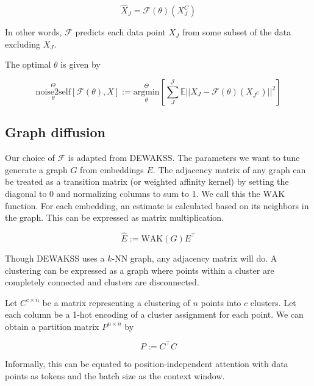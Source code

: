 \documentclass{article}
\begin{document}
\begin{equation}
  \hat{X}_J=\mathcal{F}(\theta)(X_J^C)
\end{equation}

In other words, $\mathcal{F}$ predicts each data point $X_J$ from some subset of the data excluding $X_J$. 

  The optimal $\theta$ is given by

\begin{equation}
  \underset{\theta}{\overset{\Theta}{\mathrm{noise2self}}}[\mathcal{F}(\theta),X] := \underset{\theta}{\overset{\Theta}{\mathrm{argmin}}}[\sum_{J}^{\mathcal{J}}\mathbb{E}||X_J-\mathcal{F}(\theta)(X_{J^C})||^2]
\end{equation}



\subsection{Graph diffusion}

Our choice of $\mathcal{F}$ is adapted from DEWAKSS\cite{tjarnberg2021}. The parameters we want to tune generate a graph $G$ from embeddings $E$. The adjacency matrix of any graph can be treated as a transition matrix (or weighted affinity kernel) by setting the diagonal to 0 and normalizing columns to sum to 1. We call this the $\mathrm{WAK}$ function. For each embedding, an estimate is calculated based on its neighbors in the graph. This can be expressed as matrix multiplication.

\begin{equation}
\hat{E} := \mathrm{WAK}(G)E^\top
\end{equation}

Though DEWAKSS uses a $k$-NN graph, any adjacency matrix will do.
A clustering can be expressed as a graph where points within a cluster are completely connected and clusters are disconnected.

Let $C^{c \times n}$ be a matrix representing a clustering of $n$ points into $c$ clusters. Let each column be a 1-hot encoding of a cluster assignment for each point. We can obtain a partition matrix $P^{n \times n}$ by

\begin{equation}
  P := C^\top C
\end{equation}

Informally, this can be equated to position-independent attention with data points as tokens and the batch size as the context window.
\end{document}
